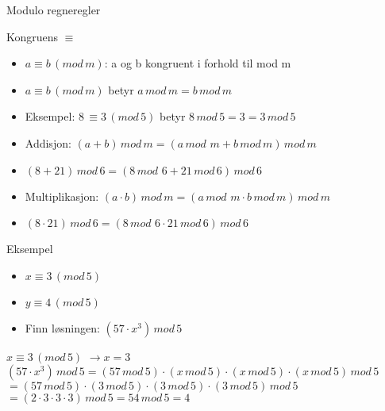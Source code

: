 \begin{frame}{Modulo regneregler}
\begin{block}{Kongruens $\equiv$}
\begin{itemize}
\item $a \equiv b\, (mod\, m)$: a og b kongruent i forhold til mod m
\item $a \equiv b\, (mod\, m)$ betyr $a\, mod\, m=b\, mod\, m$
\item Eksempel: $8\, \equiv 3\, (mod\, 5)$ betyr $8\, mod\, 5=3=3\, mod\, 5$ 
\end{itemize}
\end{block}

\begin{itemize}
\item Addisjon: $(a+b)\, mod\, m = (a\,mod\, \,m + b\, mod\, m)\, mod\, m$
\item $(8+21)\, mod\, 6 = (8\,mod\, \,6 + 21\, mod\, 6)\, mod\, 6$
\item Multiplikasjon: $(a\cdot b)\, mod\, m = (a\,mod\, \,m \cdot b\, mod\, m)\, mod\, m$
\item $(8\cdot21)\, mod\, 6 = (8\,mod\, \,6 \cdot 21\, mod\, 6)\, mod\, 6$
\end{itemize}
\end{frame}

\begin{frame}{}
\begin{exampleblock}{Eksempel}
\begin{itemize}
\item $x \equiv 3\,(mod\, 5)$
\item $y \equiv 4\,(mod\, 5)$
\item Finn løsningen: $(57\cdot x^3)\, mod\,5$
\end{itemize}
\end{exampleblock}
\medskip

$x \equiv 3\,(mod\, 5)$ $\rightarrow x=3$\\
$(57\cdot x^3)\, mod\,5=(57\, mod\, 5)\cdot (x\, mod\, 5)\cdot (x\, mod\, 5)\cdot (x\, mod\, 5)\, mod\, 5$\\
$=(57\, mod\, 5)\cdot (3\, mod\, 5)\cdot (3\, mod\, 5)\cdot (3\, mod\, 5)\, mod\, 5$\\
$=(2\cdot 3\cdot 3\cdot 3)\, mod\, 5=54\, mod\, 5=4$
\end{frame}


